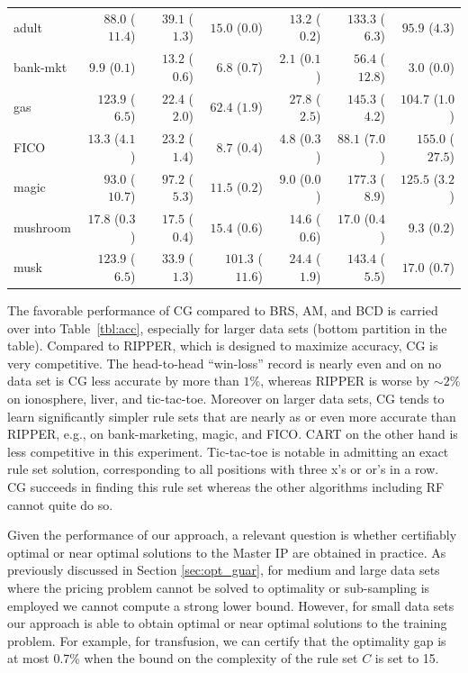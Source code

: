 \documentclass[twoside,11pt]{article}
\begin{document}
\begin{table}[t]
\begin{tabular}{lrrrrrr}
\midrule
adult&$88.0$ ($11.4$)&$39.1$ ($1.3$)&$15.0$ ($0.0$)&$\mathbf{13.2}$ ($0.2$)&$133.3$ ($6.3$)&$95.9$ ($4.3$)\\
bank-mkt&$9.9$ ($0.1$)&$13.2$ ($0.6$)&$6.8$ ($0.7$)&$\mathbf{2.1}$ ($0.1$)&$56.4$ ($12.8$)&$3.0$ ($0.0$)\\
gas&$123.9$ ($6.5$)&$\mathbf{22.4}$ ($2.0$)&$62.4$ ($1.9$)&$27.8$ ($2.5$)&$145.3$ ($4.2$)&$104.7$ ($1.0$)\\
FICO&$13.3$ ($4.1$)&$23.2$ ($1.4$)&$8.7$ ($0.4$)&$\mathbf{4.8}$ ($0.3$)&$88.1$ ($7.0$)&$155.0$ ($27.5$)\\ 
magic&$93.0$ ($10.7$)&$97.2$ ($5.3$)&$11.5$ ($0.2$)&$\mathbf{9.0}$ ($0.0$)&$177.3$ ($8.9$)&$125.5$ ($3.2$)\\
mushroom&$17.8$ ($0.3$)&$17.5$ ($0.4$)&$15.4$ ($0.6$)&$14.6$ ($0.6$)&$17.0$ ($0.4$)&$\mathbf{9.3}$ ($0.2$)\\
musk&$123.9$ ($6.5$)&$33.9$ ($1.3$)&$101.3$ ($11.6$)&$24.4$ ($1.9$)&$143.4$ ($5.5$)&$\mathbf{17.0}$ ($0.7$)\\
\bottomrule
\end{tabular}
\end{table}
The favorable performance of CG compared to BRS, AM, and BCD is carried over into Table~\ref{tbl:acc}, especially for larger data sets (bottom partition in the table).  Compared to RIPPER, which is designed to maximize accuracy, CG is very competitive.  The head-to-head ``win-loss'' record is nearly even and on no data set is CG less accurate by more than $1\%$, whereas RIPPER is worse by $\sim 2\%$ on ionosphere, liver, and tic-tac-toe.  Moreover on larger data sets, CG tends to learn significantly simpler rule sets that are nearly as or even more accurate than RIPPER, e.g., on bank-marketing, magic, and FICO.  CART on the other hand is less competitive in this experiment.  Tic-tac-toe is notable in admitting an exact rule set solution, corresponding to all positions with three x's or or's in a row. CG succeeds in finding this rule set whereas the other algorithms including RF cannot quite do so.


Given the performance of our approach, a relevant question is whether certifiably optimal or near optimal solutions to the Master IP are obtained in practice. As previously discussed in Section \ref{sec:opt_guar}, for medium and large data sets where the pricing problem cannot be solved to optimality or sub-sampling is employed we cannot compute a strong lower bound. However, for small data sets our approach is able to obtain optimal or near optimal solutions to the training problem. For example, for transfusion, we can certify that the optimality gap is at most 0.7\% when the bound on the complexity of the rule set $C$ is set to 15.
\end{document}
